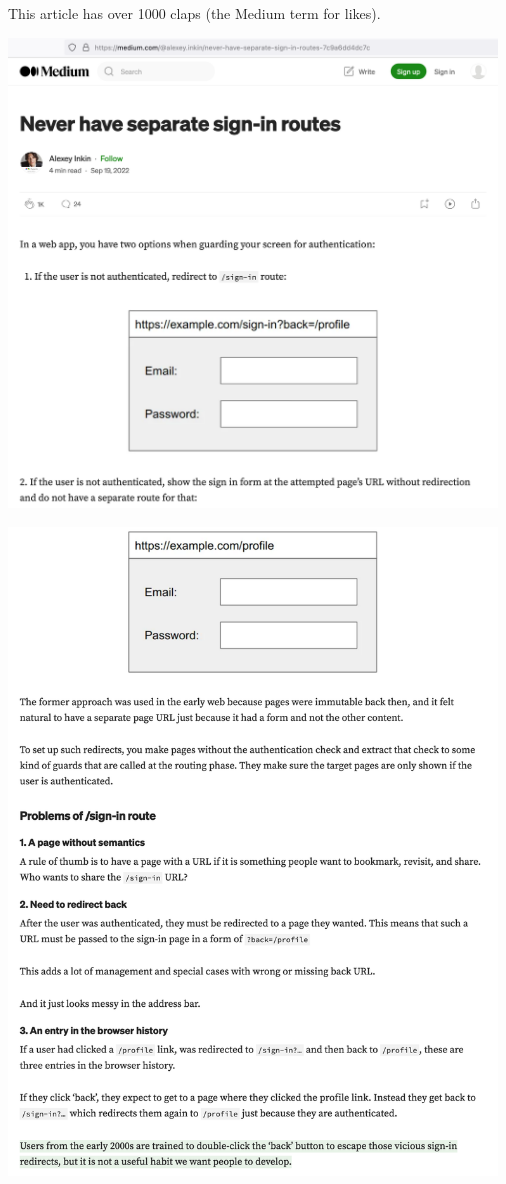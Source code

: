 
This article has over 1000 claps (the Medium term for likes).

\begin{center}
    \includegraphics[width=35em]{sign-in-routes-p1}
\end{center}
\WillContinue
\pagebreak

\Continuing
\begin{center}
    \includegraphics[width=35em]{sign-in-routes-p2}
\end{center}
\WillContinue
\pagebreak


